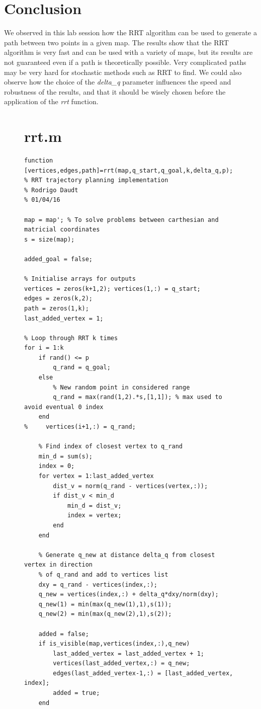 \documentclass[journal]{IEEEtran}
\begin{document}
\section{Conclusion}\label{conclusion}

We observed in this lab session how the RRT algorithm can be used to generate a path between two points in a given map. The results show that the RRT algorithm is very fast and can be used with a variety of maps, but its results are not guaranteed even if a path is theoretically possible. Very complicated paths may be very hard for stochastic methods such as RRT to find. We could also observe how the choice of the \textit{delta\_q} parameter influences the speed and robustness of the results, and that it should be wisely chosen before the application of the \textit{rrt} function.



\appendices
\begin{figure}
\section{rrt.m}\label{aprrt}

\begin{verbatim}
function [vertices,edges,path]=rrt(map,q_start,q_goal,k,delta_q,p);
% RRT trajectory planning implementation
% Rodrigo Daudt
% 01/04/16

map = map'; % To solve problems between carthesian and matricial coordinates
s = size(map);

added_goal = false;

% Initialise arrays for outputs
vertices = zeros(k+1,2); vertices(1,:) = q_start;
edges = zeros(k,2);
path = zeros(1,k);
last_added_vertex = 1;

% Loop through RRT k times
for i = 1:k
    if rand() <= p
        q_rand = q_goal;
    else
        % New random point in considered range
        q_rand = max(rand(1,2).*s,[1,1]); % max used to avoid eventual 0 index
    end
%     vertices(i+1,:) = q_rand;

    % Find index of closest vertex to q_rand
    min_d = sum(s);
    index = 0;
    for vertex = 1:last_added_vertex
        dist_v = norm(q_rand - vertices(vertex,:));
        if dist_v < min_d
            min_d = dist_v;
            index = vertex;
        end
    end

    % Generate q_new at distance delta_q from closest vertex in direction
    % of q_rand and add to vertices list
    dxy = q_rand - vertices(index,:);
    q_new = vertices(index,:) + delta_q*dxy/norm(dxy);
    q_new(1) = min(max(q_new(1),1),s(1));
    q_new(2) = min(max(q_new(2),1),s(2));

    added = false;
    if is_visible(map,vertices(index,:),q_new)
        last_added_vertex = last_added_vertex + 1;
        vertices(last_added_vertex,:) = q_new;
        edges(last_added_vertex-1,:) = [last_added_vertex, index];
        added = true;
    end
\end{verbatim}

\end{figure}
\end{document}
